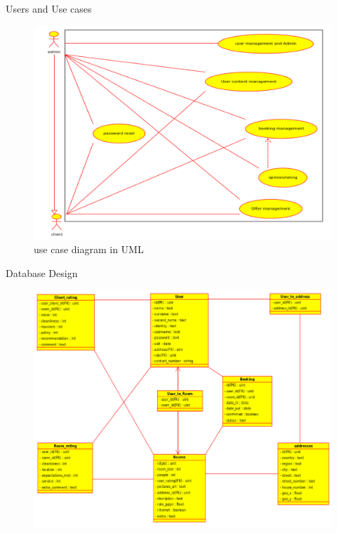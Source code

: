 \documentclass[11pt]{beamer}
\begin{document}
\begin{frame}{Users and Use cases}
	\begin{figure}
		\includegraphics[scale=0.2]{../img/updated_use_case.jpg} 
		\caption{use case diagram in UML}
	\end{figure}
\end{frame}

\begin{frame}{Database Design}
\begin{figure}
\includegraphics[scale=0.3]{../img/drawing.jpg} 
\end{figure}

\end{frame}
\end{document}
